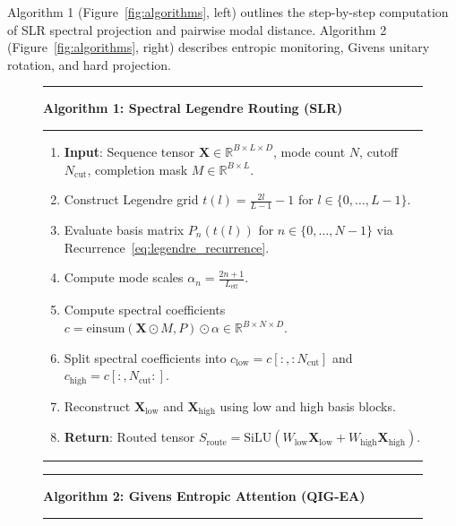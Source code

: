 \documentclass{article}
\newcommand{\slr}{\textsc{SLR}\xspace}
\newcommand{\qigea}{\textsc{QIG-EA}\xspace}
\begin{document}
Algorithm 1 (Figure~\ref{fig:algorithms}, left) outlines the step-by-step computation of \slr spectral projection and pairwise modal distance. Algorithm 2 (Figure~\ref{fig:algorithms}, right) describes entropic monitoring, Givens unitary rotation, and hard projection.

\begin{figure}[h]
\begin{minipage}{0.48\textwidth}
\centering
\hrule \vspace{3pt}
\textbf{Algorithm 1: Spectral Legendre Routing (\slr)}\label{alg:slr}
\vspace{3pt} \hrule \vspace{4pt}
\begin{enumerate}[leftmargin=1.2em,label=\arabic*:]
  \item \textbf{Input}: Sequence tensor $\mathbf{X} \in \mathbb{R}^{B \times L \times D}$, mode count $N$, cutoff $N_{\text{cut}}$, completion mask $M \in \mathbb{R}^{B \times L}$.
  \item Construct Legendre grid $t(l) = \frac{2l}{L-1} - 1$ for $l \in \{0, \dots, L-1\}$.
  \item Evaluate basis matrix $P_n(t(l))$ for $n \in \{0, \dots, N-1\}$ via Recurrence~\eqref{eq:legendre_recurrence}.
  \item Compute mode scales $\alpha_n = \frac{2n+1}{L_{\text{eff}}}$.
  \item Compute spectral coefficients $c = \text{einsum}(\mathbf{X} \odot M, P) \odot \alpha \in \mathbb{R}^{B \times N \times D}$.
  \item Split spectral coefficients into $c_{\text{low}} = c[:, :N_{\text{cut}}]$ and $c_{\text{high}} = c[:, N_{\text{cut}}:]$.
  \item Reconstruct $\mathbf{X}_{\text{low}}$ and $\mathbf{X}_{\text{high}}$ using low and high basis blocks.
  \item \textbf{Return}: Routed tensor $S_{\text{route}} = \text{SiLU}(W_{\text{low}} \mathbf{X}_{\text{low}} + W_{\text{high}} \mathbf{X}_{\text{high}})$.
\end{enumerate}
\vspace{4pt} \hrule
\end{minipage}
\hfill
\begin{minipage}{0.48\textwidth}
\centering
\hrule \vspace{3pt}
\textbf{Algorithm 2: Givens Entropic Attention (\qigea)}\label{alg:qigea}
\vspace{3pt} \hrule \vspace{4pt}

\end{minipage}
\end{figure}
\end{document}
